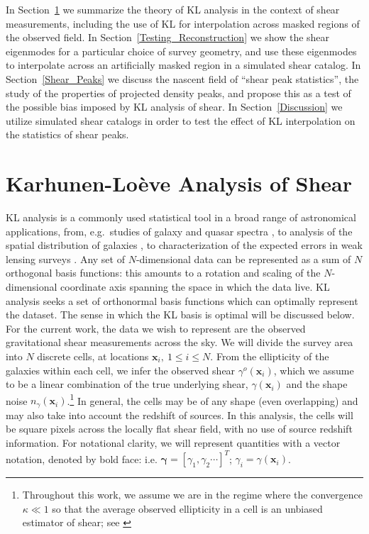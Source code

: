 \documentclass[twocolumn]{emulateapj}
\newcommand{\myvec}[1]{\boldsymbol{#1}}
\begin{document}
In Section~\ref{KL_Intro} we summarize the theory of KL analysis in the
context of shear measurements, including the use of KL for interpolation
across masked regions of the observed field.
In Section~\ref{Testing_Reconstruction} we show the shear eigenmodes for
a particular choice of survey geometry, and use these eigenmodes to
interpolate across an artificially masked region in a simulated shear catalog.
In Section~\ref{Shear_Peaks} we discuss the nascent field of 
``shear peak statistics'',
the study of the properties of projected density peaks, and propose this
as a test of the possible bias imposed by KL analysis of shear.
In Section~\ref{Discussion} we utilize simulated shear catalogs 
in order to test the effect of KL interpolation on
the statistics of shear peaks.

\section{Karhunen-Lo\`{e}ve Analysis of Shear}
\label{KL_Intro}
KL analysis is a commonly used statistical tool
in a broad range of astronomical applications, from, e.g.~studies of 
galaxy and quasar spectra \citep{Connolly95,Connolly99,Yip04A,Yip04B}, to 
analysis of the spatial distribution of galaxies 
\citep{Vogeley96,Matsubara00,Pope04}, to characterization of the 
expected errors in weak lensing surveys \citep{Kilbinger06, Munshi06}.    
Any set of $N$-dimensional data can be represented as a sum of 
$N$ orthogonal basis functions: this amounts to a rotation and scaling of 
the $N$-dimensional coordinate axis spanning the space in which the data live.
KL analysis seeks a set of orthonormal basis functions which can optimally
represent the dataset.  The sense in which the KL basis is optimal will be
discussed below.  For the current work, the data we wish to represent are the 
observed gravitational shear measurements across the sky.  
We will divide the survey 
area into $N$ discrete cells, at locations $\myvec{x}_i,\ 1\le i \le N$.  
From the ellipticity of the galaxies within each cell, 
we infer the observed shear $\gamma^o(\myvec{x}_i)$, which we assume
to be a linear combination of the true underlying shear, $\gamma(\myvec{x}_i)$
and the shape noise $n_\gamma(\myvec{x}_i)$.\footnote{
Throughout this work, we assume we are in the regime where the convergence
$\kappa \ll 1$ so that the average observed ellipticity in a 
cell is an unbiased estimator of shear; see \citet{Bartelmann01}}
In general, the cells may be of any shape (even overlapping) 
and may also take into account the redshift of sources.
In this analysis, the cells will be square pixels across the locally 
flat shear field, with no use of source redshift information.  
For notational clarity, we will represent quantities with a vector notation,
denoted by bold face: i.e. $\myvec{\gamma} = [\gamma_1,\gamma_2\cdots]^T$; 
$\gamma_i = \gamma(\myvec{x}_i)$. 
\end{document}
